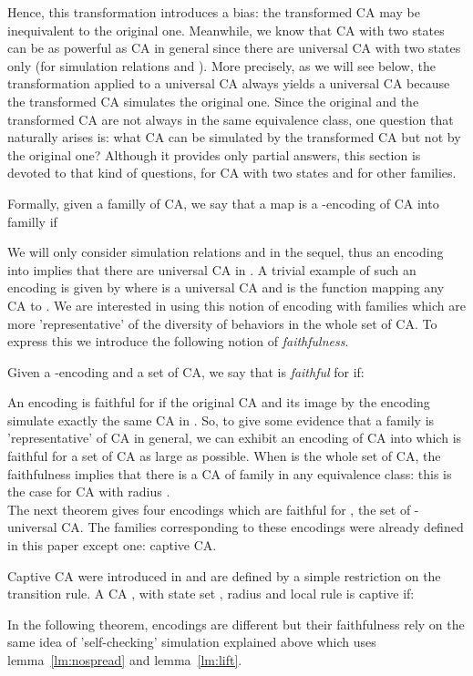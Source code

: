 \documentclass[a4paper]{elsarticle}
\begin{document}
Hence, this transformation introduces a bias: the transformed CA may
be inequivalent to the original one. Meanwhile, we know that CA with
two states can be as powerful as CA in general since there are
universal CA with two states only \cite{banks,nicolasFCT} (for
simulation relations  and ). More precisely, as
we will see below, the transformation applied to a universal CA always
yields a universal CA because the transformed CA simulates the
original one. Since the original and the transformed CA are not always
in the same equivalence class, one question that naturally arises is:
what CA can be simulated by the transformed CA but not by the original
one?  Although it provides only partial answers, this section is
devoted to that kind of questions, for CA with two states and for
other families.

Formally, given a familly  of CA, we say that a map
 is a -encoding of CA into familly
 if

We will only consider simulation relations  and  in the
sequel, thus an encoding into  implies that there are universal CA in
. A trivial example of such an encoding is given by 
where  is a universal CA and  is the function mapping any CA to
.  We are interested in using this notion of encoding with families which
are more 'representative' of the diversity of behaviors in the whole set of CA.
To express this we introduce the following notion of \emph{faithfulness}.

Given a -encoding  and a set  of
CA, we say that  is \emph{faithful} for  if:

An encoding is faithful for  if the original CA and its image by
the encoding simulate exactly the same CA in . So, to give some
evidence that a family  is 'representative' of CA in general,
we can exhibit an encoding of CA into  which is faithful for a
set  of CA as large as possible. When  is the whole set of CA,
the faithfulness implies that there is a CA of family  in any
equivalence class: this is the case for CA with radius .\\

The next theorem gives four encodings which are faithful for , the
set of -universal CA. The families corresponding to these
encodings were already defined in this paper except one: captive CA.

Captive CA were introduced in \cite{Theyssier04} and are defined by a
simple restriction on the transition rule. A CA , with state set
, radius  and local rule  is captive if:


In the following theorem, encodings are different but their
faithfulness rely on the same idea of 'self-checking' simulation
explained above which uses lemma~\ref{lm:nospread} and
lemma~\ref{lm:lift}.
\end{document}

